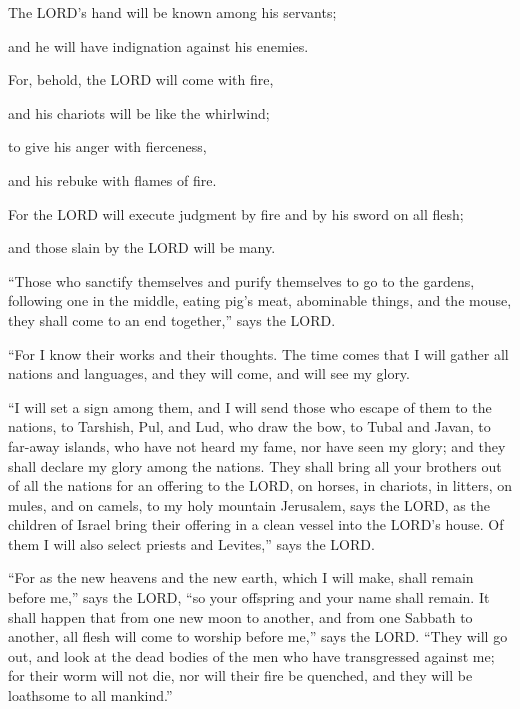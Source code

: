 The LORD’s hand will be known among his servants;

and he will have indignation against his enemies.


\vspace{\baselineskip} \myverse{}For, behold, the LORD will come with fire,

and his chariots will be like the whirlwind;

to give his anger with fierceness,

and his rebuke with flames of fire.

\myverse{}For the LORD will execute judgment by fire and by his sword
on all flesh;

and those slain by the LORD will be many.

\myverse{}“Those who sanctify themselves and purify themselves to go to
the gardens, following one in the middle, eating pig’s meat, abominable things, and the mouse, they shall
come to an end together,” says the LORD.

\myverse{}“For I know their works and their thoughts. The time comes that
I will gather all nations and languages, and they will come, and will see my glory.

\myverse{}“I will set a sign among them, and I will send those who escape
of them to the nations, to Tarshish, Pul, and Lud, who draw the bow, to Tubal and Javan, to far-away islands,
who have not heard my fame, nor have seen my glory; and they shall declare my glory among the nations.
\myverse{}They shall bring all your brothers out of all the nations for an offering
to the LORD, on horses, in chariots, in litters, on mules, and on camels, to my holy mountain Jerusalem,
says the LORD, as the children of Israel bring their offering in a clean vessel into the LORD’s house.
\myverse{}Of them I will also select priests and Levites,” says the LORD.

\myverse{}“For as the new heavens and the new earth, which I will make,
shall remain before me,” says the LORD, “so your offspring and your name shall remain.
\myverse{}It shall happen that from one new moon to another, and from one Sabbath to
another, all flesh will come to worship before me,” says the LORD.
\myverse{}“They will go out, and look at the dead bodies of the men who have transgressed
against me; for their worm will not die, nor will their fire be quenched, and they will be loathsome to
all mankind.”


